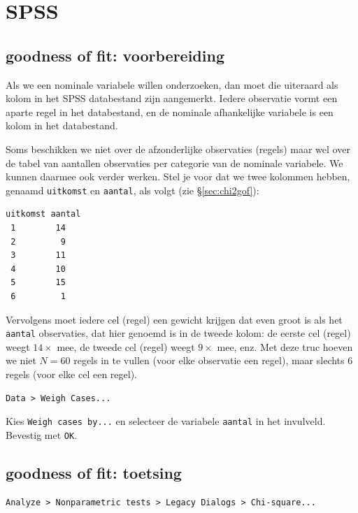 \documentclass[
]{book}
\begin{document}
\hypertarget{spss-14}{%
\section{SPSS}\label{spss-14}}

\hypertarget{goodness-of-fit-voorbereiding}{%
\subsection{goodness of fit: voorbereiding}\label{goodness-of-fit-voorbereiding}}

Als we een nominale variabele willen onderzoeken, dan moet die uiteraard
als kolom in het SPSS databestand zijn aangemerkt. Iedere observatie
vormt een aparte regel in het databestand, en de nominale afhankelijke
variabele is een kolom in het databestand.

Soms beschikken we niet over de afzonderlijke observaties (regels) maar
wel over de tabel van aantallen observaties per categorie van de
nominale variabele. We kunnen daarmee ook verder werken. Stel je voor
dat we twee kolommen hebben, genaamd \texttt{uitkomst} en \texttt{aantal}, als volgt
(zie §\ref{sec:chi2gof}):

\begin{verbatim}
uitkomst aantal
 1        14
 2         9
 3        11
 4        10
 5        15
 6         1
\end{verbatim}

Vervolgens moet iedere cel (regel) een gewicht krijgen dat even groot is
als het \texttt{aantal} observaties, dat hier genoemd is in de tweede kolom: de
eerste cel (regel) weegt \(14\times\) mee, de tweede cel (regel) weegt
\(9\times\) mee, enz. Met deze truc hoeven we niet \(N=60\) regels in te
vullen (voor elke observatie een regel), maar slechts 6 regels (voor
elke cel een regel).

\begin{verbatim}
Data > Weigh Cases... 
\end{verbatim}

Kies \texttt{Weigh\ cases\ by...} en selecteer de variabele \texttt{aantal} in
het invulveld. Bevestig met \texttt{OK}.

\hypertarget{goodness-of-fit-toetsing}{%
\subsection{goodness of fit: toetsing}\label{goodness-of-fit-toetsing}}

\begin{verbatim}
Analyze > Nonparametric tests > Legacy Dialogs > Chi-square...
\end{verbatim}
\end{document}
